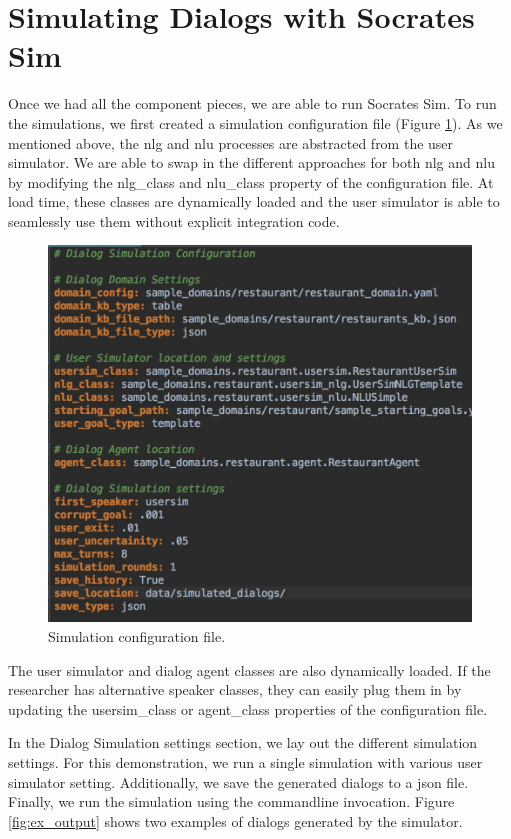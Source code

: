 \section{Simulating Dialogs with Socrates Sim}
Once we had all the component pieces, we are able to run Socrates Sim. To run the simulations, we first created a simulation configuration file (Figure \ref{fig:restaurant_sim_config }). As we mentioned above, the nlg and nlu processes are abstracted from the user simulator. We are able to swap in the different approaches for both nlg and nlu by modifying the nlg\_class and nlu\_class property of the configuration file. At load time, these classes are dynamically loaded and the user simulator is able to seamlessly use them without explicit integration code. 

\begin{figure}[h!]
	\centering
	\includegraphics[scale=.35]{diagrams/restaurant_sim_config.jpeg}
	\caption{ Simulation configuration file. }
	\label{fig:restaurant_sim_config }
\end{figure}

The user simulator and dialog agent classes are also dynamically loaded. If the researcher has alternative speaker classes, they can easily plug them in by updating the usersim\_class or agent\_class properties of the configuration file.

In the Dialog Simulation settings section, we lay out the different simulation settings. For this demonstration, we run a single simulation with various user simulator setting. Additionally, we save the generated dialogs to a json file. Finally, we run the simulation using the commandline invocation. Figure \ref{fig:ex_output} shows two examples of dialogs generated by the simulator. 

